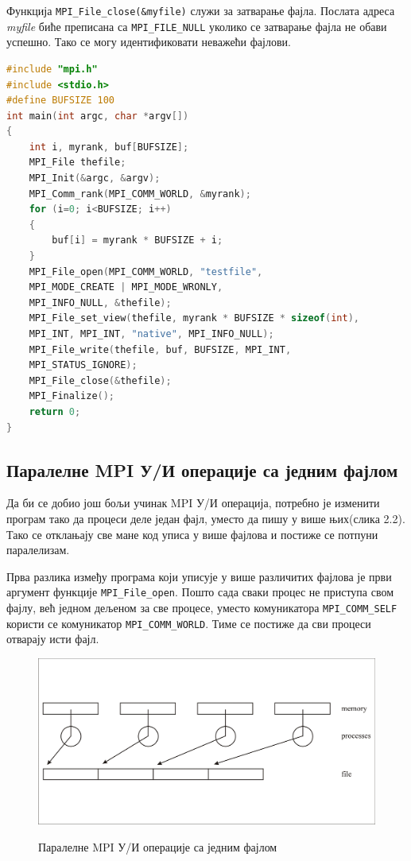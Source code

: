 Функција \texttt{MPI\_File\_close(\&myfile)} служи за затварање фајла. Послата адреса \textit{myfile} биће преписана са  \texttt{MPI\_FILE\_NULL} уколико се затварање фајла не обави успешно. Тако се могу идентификовати неважећи фајлови.

\begin{lstlisting}[style=nonumbers,frame=single,language=C, caption=MPI програм за паралелним MPI функцијама]
#include "mpi.h"
#include <stdio.h>
#define BUFSIZE 100
int main(int argc, char *argv[])
{
	int i, myrank, buf[BUFSIZE];
	MPI_File thefile;
	MPI_Init(&argc, &argv);
	MPI_Comm_rank(MPI_COMM_WORLD, &myrank);
	for (i=0; i<BUFSIZE; i++)
	{
		buf[i] = myrank * BUFSIZE + i;
	}
	MPI_File_open(MPI_COMM_WORLD, "testfile",
	MPI_MODE_CREATE | MPI_MODE_WRONLY,
	MPI_INFO_NULL, &thefile);
	MPI_File_set_view(thefile, myrank * BUFSIZE * sizeof(int),
	MPI_INT, MPI_INT, "native", MPI_INFO_NULL);
	MPI_File_write(thefile, buf, BUFSIZE, MPI_INT,
	MPI_STATUS_IGNORE);
	MPI_File_close(&thefile);
	MPI_Finalize();
	return 0;
}
\end{lstlisting}


\subsection{Паралелне MPI У/И операције са једним фајлом}

Да би се добио још бољи учинак MPI У/И операција, потребно је изменити програм тако да процеси деле један фајл, уместо да пишу у више њих(слика 2.2). Тако се отклањају све мане код уписа у више фајлова и постиже се потпуни паралелизам.

Прва разлика између програма који уписује у више различитих фајлова је први аргумент функције \texttt{MPI\_File\_open}. Пошто сада сваки процес не приступа свом фајлу, већ једном дељеном за све процесе, уместо комуникатора \texttt{MPI\_COMM\_SELF} користи се комуникатор  \texttt{MPI\_COMM\_WORLD}. Тиме се постиже да сви процеси отварају исти фајл.

\begin{figure}[h!]
  \centering
      \includegraphics[width=1\textwidth]{slike/paralel_i_o_single_file.png}\\[1cm]
  \caption{Паралелне MPI У/И операције са једним фајлом}
\end{figure}

